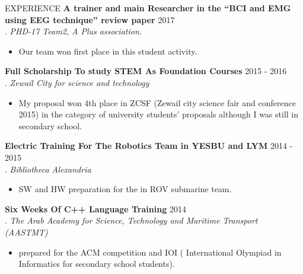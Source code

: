 \documentclass{resume} %
\begin{document}
\begin{rSection}{EXPERIENCE}
     \textbf{A trainer and main Researcher in the “BCI and EMG using EEG technique” review paper} \hfill   2017\\
. \hfill \textit{PHD-17 Team2, A Plus association.}
  \begin{itemize}
     \itemsep -3pt {} 
      \item  Our team won first place in this student activity.
 \end{itemize}
 
 \textbf{Full Scholarship To study STEM As Foundation Courses} \hfill  2015 -  2016\\
. \hfill \textit{Zewail City for science and technology}
  \begin{itemize}
     \itemsep -3pt {} 
      \item My proposal won 4th place in ZCSF (Zewail city science fair and conference 2015) in the category of university students’ proposals although I was still in secondary school.
\end{itemize}

     \textbf{Electric Training For The Robotics Team in YESBU and LYM} \hfill   2014 - 2015\\
. \hfill \textit{Bibliotheca Alexandria}
  \begin{itemize}
     \itemsep -3pt {} 
      \item  SW and HW preparation for the in ROV submarine team.
 \end{itemize}

     \textbf{Six Weeks Of C++ Language Training} \hfill   2014\\
. \hfill \textit{The Arab Academy for Science, Technology and Maritime Transport (AASTMT) }
  \begin{itemize}
     \itemsep -3pt {} 
      \item  prepared for the ACM competition and IOI ( International Olympiad in Informatics for secondary school students).
 \end{itemize}
 
 \end{rSection} 
\end{document}
